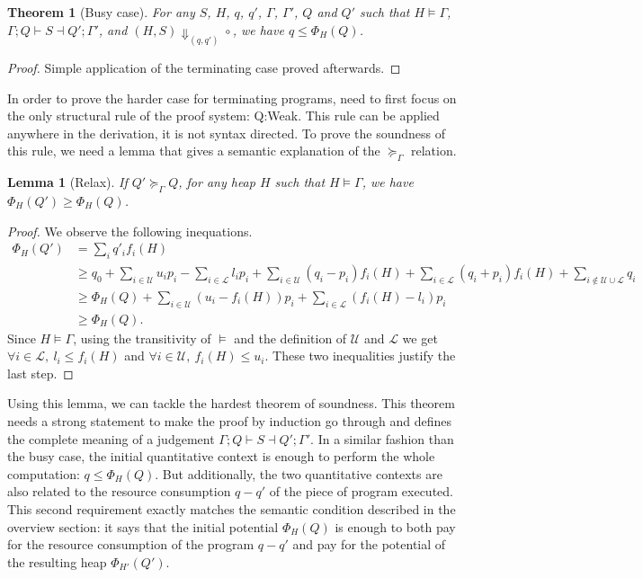\documentclass[nocopyrightspace,preprint]{sigplanconf}
\newtheorem{lemma}{Lemma}
\newtheorem{theorem}{Theorem}
\begin{document}
\begin{theorem}[Busy case]
For any $S$, $H$, $q$, $q'$, $\Gamma$, $\Gamma'$, $Q$ and $Q'$
such that $H \models \Gamma$, $\Gamma; Q \vdash S \dashv Q'; \Gamma'$,
  and $(H, S) \Downarrow_{(q,q')} \circ$,
we have $q \le \Phi_H(Q)$.
\end{theorem}
\begin{proof}
Simple application of the terminating case proved afterwards.
\end{proof}

In order to prove the harder case for terminating programs, need to first
focus on the only structural rule of the proof system: {\sc Q:Weak}.  This
rule can be applied anywhere in the derivation, it is not syntax directed.
To prove the soundness of this rule, we need a lemma that gives a
semantic explanation of the $\succeq_\Gamma$ relation.

\begin{lemma}[Relax]
If $Q' \succeq_\Gamma Q$, for any heap $H$ such that $H \models \Gamma$,
we have $\Phi_H(Q') \ge \Phi_H(Q)$.
\end{lemma}
\begin{proof}
We observe the following inequations.
\begin{align*}
\Phi_H(Q') &= \sum_i q'_i f_i(H) \\
&\ge q_0 + \sum_{i\in\mathcal U} u_i p_i - \sum_{i\in\mathcal L} l_i p_i
  + \sum_{i\in\mathcal U} (q_i - p_i) f_i(H) + \sum_{i\in\mathcal L} (q_i + p_i) f_i(H)
  + \sum_{i\not\in \mathcal U \cup \mathcal L} q_i \\
 &\ge \Phi_H(Q)
  + \sum_{i\in\mathcal U} (u_i - f_i(H)) p_i
  + \sum_{i\in\mathcal L} (f_i(H) - l_i) p_i \\
 &\ge \Phi_H(Q).
\end{align*}
Since $H \models \Gamma$, using the transitivity of $\models$ and
the definition of $\mathcal U$ and $\mathcal L$ we get
$\forall i\in\mathcal L,~ l_i \le f_i(H)$ and
$\forall i\in\mathcal U,~ f_i(H)\le u_i$.
These two inequalities justify the last step.
\end{proof}

Using this lemma, we can tackle the hardest theorem of soundness.  This theorem
needs a strong statement to make the proof by induction go through and defines
the complete meaning of a judgement $\Gamma; Q \vdash S \dashv Q'; \Gamma'$.
In a similar fashion than the busy case, the initial quantitative context is enough
to perform the whole computation: $q \le \Phi_H(Q)$.  But additionally, the
two quantitative contexts are also related to the resource consumption $q - q'$
of the piece of program executed.  This second requirement exactly matches
the semantic condition described in the overview section: it says that the
initial potential $\Phi_H(Q)$ is enough to both pay for the resource
consumption of the program $q - q'$ and pay for the potential of the resulting
heap $\Phi_{H'}(Q')$.
\end{document}
